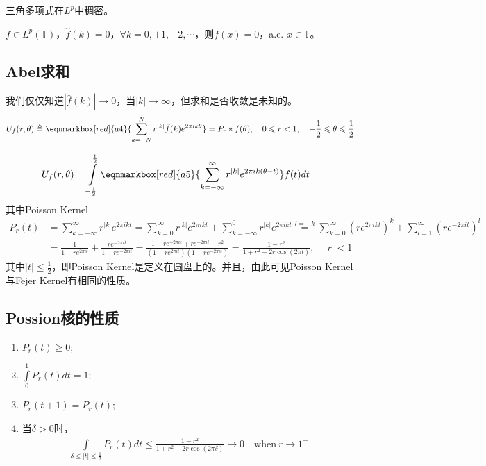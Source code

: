 \begin{Corollary}
    三角多项式在$L^p$中稠密。
\end{Corollary}

\begin{Corollary}
    $f\in L^p(\mathbb{T})$，$\hat{f}(k)= 0$，$\forall k=0,\pm 1,\pm 2,\cdots$，则$f(x)=0$，a.e. $x\in\mathbb{T}$。
\end{Corollary}

\newpage
\subsection{Abel求和}
我们仅仅知道$|\hat{f}(k)| \to 0$，当$|k|\to\infty$，但求和是否收敛是未知的。
\begin{align*}
    U_f(r,\theta) \triangleq \eqnmarkbox[red]{a4}{\sum\limits_{k=-N}^{N} r^{|k|} \hat{f}(k) e^{2\pi i k \theta}} = P_r * f(\theta), \quad 0\leqslant r < 1, \quad -\frac{1}{2}\leqslant\theta\leqslant\frac{1}{2}
\end{align*}

\begin{align*}
    U_f(r,\theta) & = \int\limits_{-\frac{1}{2}}^{\frac{1}{2}} \eqnmarkbox[red]{a5}{\sum\limits_{k=-\infty}^{\infty} r^{|k|} e^{2\pi i k (\theta - t)}} f(t) dt
\end{align*}
其中Poisson Kernel
\begin{align*}
    P_r(t) & = \sum\limits_{k=-\infty}^{\infty} r^{|k|} e^{2\pi i k t} = \sum\limits_{k=0}^{\infty} r^{|k|} e^{2\pi i k t} + \sum\limits_{k=-\infty}^{0} r^{|k|} e^{2\pi i k t} \overset{l=-k}{=} \sum\limits_{k=0}^{\infty} \left(r e^{2\pi i k t}\right)^k + \sum\limits_{l=1}^{\infty} \left(r e^{-2\pi i t}\right)^l \\
    & = \frac{1}{1 - re^{2\pi i t}} + \frac{re^{-2\pi i t}}{1 - re^{-2\pi i t}} = \frac{1 - re^{-2\pi i t} + r e^{-2\pi i t} - r^2}{(1 - re^{2\pi i t})(1 - re^{-2\pi i t})} = \frac{1-r^2}{1 + r^2 - 2r \cos(2\pi t)},\quad |r| < 1
\end{align*}
其中$|t|\leqslant \frac{1}{2}$，即Poisson Kernel是定义在圆盘上的。并且，由此可见Poisson Kernel与Fejer Kernel有相同的性质。
\subsection{Possion核的性质}
\begin{enumerate}[leftmargin=1cm, label=\arabic*]
    \item $P_r(t) \geqslant 0$;
    \item $\int\limits_0^1 P_r(t) dt = 1$;
    \item $P_r(t+1) = P_r(t)$;
    \item 当$\delta >0$时，
    \begin{align*}
    \int\limits_{\delta\leqslant|t|\leqslant\frac{1}{2}} P_r(t) dt \leqslant \frac{1-r^2}{1+r^2 - 2r\cos(2\pi \delta)}\to 0 \quad \text{when}\ r\to 1^{-}    \end{align*}
\end{enumerate}

